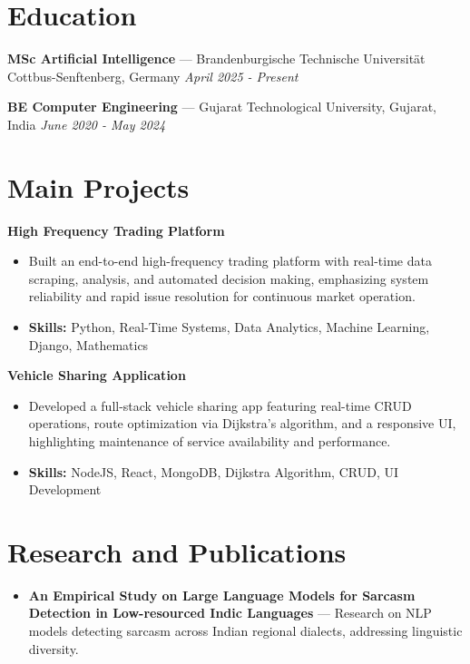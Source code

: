 \documentclass[a4paper,10pt]{article}
\begin{document}
\section*{Education}
\textbf{MSc Artificial Intelligence} — Brandenburgische Technische Universität Cottbus-Senftenberg, Germany \hfill \textit{April 2025 - Present}\par
\vspace{1.5pt}
\textbf{BE Computer Engineering} — Gujarat Technological University, Gujarat, India \hfill \textit{June 2020 - May 2024}\par

\section*{Main Projects}
\textbf{High Frequency Trading Platform}\par
\vspace{1pt}
\begin{itemize}
  \item Built an end-to-end high-frequency trading platform with real-time data scraping, analysis, and automated decision making, emphasizing system reliability and rapid issue resolution for continuous market operation.
  \item \textbf{Skills:} Python, Real-Time Systems, Data Analytics, Machine Learning, Django, Mathematics
\end{itemize}
\vspace{3pt}
\textbf{Vehicle Sharing Application}\par
\vspace{1pt}
\begin{itemize}
  \item Developed a full-stack vehicle sharing app featuring real-time CRUD operations, route optimization via Dijkstra's algorithm, and a responsive UI, highlighting maintenance of service availability and performance.
  \item \textbf{Skills:} NodeJS, React, MongoDB, Dijkstra Algorithm, CRUD, UI Development
\end{itemize}

\section*{Research and Publications}
\begin{itemize}
\item \textbf{An Empirical Study on Large Language Models for Sarcasm Detection in Low-resourced Indic Languages} — Research on NLP models detecting sarcasm across Indian regional dialects, addressing linguistic diversity.
\end{itemize}
\end{document}
